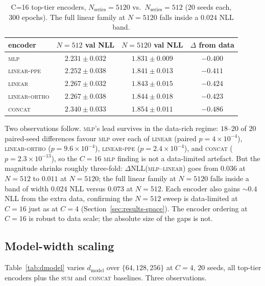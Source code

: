 \documentclass[11pt]{article}
\begin{document}
\begin{table}[h]
\centering
\caption{C=16 top-tier encoders, $N_{\text{series}}{=}5120$ vs.\
$N_{\text{series}}{=}512$ (20 seeds each, 300 epochs). The full
linear family at $N{=}5120$ falls inside a $0.024$ NLL band.}
\label{tab:main-largen}
\begin{tabular}{lccc}
\toprule
encoder & $N{=}512$ val NLL & $N{=}5120$ val NLL & $\Delta$ from data \\
\midrule
\textsc{mlp}        & $2.231 \pm 0.032$ & $1.831 \pm 0.009$ & $-0.400$ \\
\textsc{linear-ppe} & $2.252 \pm 0.038$ & $1.841 \pm 0.013$ & $-0.411$ \\
\textsc{linear}     & $2.267 \pm 0.032$ & $1.843 \pm 0.015$ & $-0.424$ \\
\textsc{linear-ortho}  & $2.267 \pm 0.038$ & $1.844 \pm 0.018$ & $-0.423$ \\
\textsc{concat}     & $2.340 \pm 0.033$ & $1.854 \pm 0.011$ & $-0.486$ \\
\bottomrule
\end{tabular}
\end{table}

Two observations follow. \textsc{mlp}'s lead survives in the
data-rich regime: $18$--$20$ of $20$ paired-seed differences favour
\textsc{mlp} over each of \textsc{linear}
(paired $p{=}4{\times}10^{-4}$), \textsc{linear-ortho}
($p{=}9.6{\times}10^{-4}$), \textsc{linear-ppe}
($p{=}2.4{\times}10^{-4}$), and \textsc{concat}
($p{=}2.3{\times}10^{-13}$), so the $C{=}16$ \textsc{mlp} finding
is not a data-limited artefact. But the magnitude shrinks roughly
three-fold: $\Delta$NLL(\textsc{mlp}--\textsc{linear}) goes from
$0.036$ at $N{=}512$ to $0.011$ at $N{=}5120$; the full linear
family at $N{=}5120$ falls inside a band of width $0.024$ NLL
versus $0.073$ at $N{=}512$. Each encoder also gains ${\sim}0.4$ NLL from the extra
data, confirming the $N{=}512$ sweep is data-limited at $C{=}16$ just
as at $C{=}4$ (Section~\ref{sec:results-space}). The encoder ordering
at $C{=}16$ is robust to data scale; the absolute size of the gaps
is not.

\subsection{Model-width scaling}
\label{sec:results-dmodel}



Table~\ref{tab:dmodel} varies $d_{\text{model}}$ over $\{64, 128, 256\}$
at $C{=}4$, $20$ seeds, all top-tier encoders plus the \textsc{sum}
and \textsc{concat} baselines. Three observations.
\end{document}
